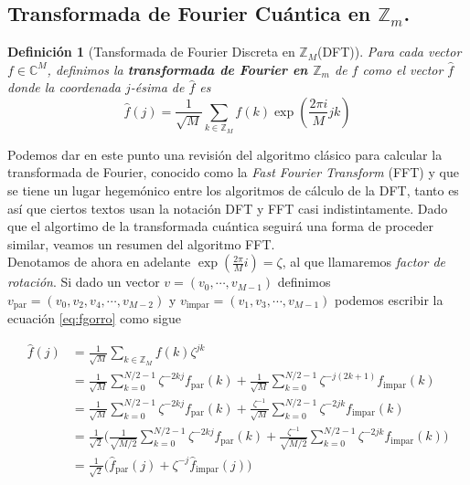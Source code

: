 \documentclass[11pt, spanish]{report}
\numberwithin{equation}{section}
\newtheorem{defin}{Definición}[section]
\numberwithin{defin}{section}
\newenvironment{yellowBox}{\begin{tcolorbox}[colback=yellow!5!white,colframe=yellow!75!black]}{\end{tcolorbox}}
\begin{document}
\subsection{Transformada de Fourier Cuántica en \texorpdfstring{$\mathbb{Z}_m$}{Zm}.}\label{FourierSecc}
\begin{yellowBox}
\begin{defin}[Tansformada de Fourier Discreta en $\mathbb{Z}_M$(DFT)]
Para cada vector $f\in \mathbb{C}^M$, definimos la \textbf{transformada de Fourier en $\mathbb{Z}_m$} de $f$ como el vector $\hat{f}$ donde la coordenada $j$-ésima de $\hat{f}$ es 
\begin{equation} \label{eq:fgorro}
\hat{f}(j)=\frac{1}{\sqrt{M}}\sum_{k\in \mathbb{Z}_M}f(k)\exp(\frac{2\pi i}{M}jk)
\end{equation}

\end{defin}
\end{yellowBox}

Podemos dar en este punto una revisión del algoritmo clásico para calcular la transformada de Fourier, conocido como la \emph{Fast Fourier Transform} (FFT) y que se tiene un lugar hegemónico entre los algoritmos de cálculo de la DFT, tanto es así que ciertos textos usan la notación DFT y FFT casi indistintamente. Dado que el algortimo de la transformada cuántica seguirá una forma de proceder similar, veamos un resumen del algoritmo FFT.\\

Denotamos de ahora en adelante $\exp(\frac{2\pi}{M}i)=\zeta$, al que llamaremos \emph{factor de rotación}. Si dado un vector $v=(v_0,\cdots,v_{M-1})$ definimos $v_\text{par}=(v_0,v_2, v_4,\cdots,v_{M-2})$ y $v_\text{impar}=(v_1, v_3,\cdots,v_{M-1})$ podemos escribir la ecuación \ref{eq:fgorro} como sigue

\begin{equation}
\begin{split}
\hat{f}(j)&=\frac{1}{\sqrt{M}}\sum_{k\in \mathbb{Z}_M}f(k)\zeta^{jk}\\
&=\frac{1}{\sqrt{M}}\sum_{k=0}^{N/2-1}\zeta^{-2kj}f_\text{par}(k)+\frac{1}{\sqrt{M}}\sum_{k=0}^{N/2-1}\zeta^{-j(2k+1)}f_{\text{impar}}(k)\\
&=\frac{1}{\sqrt{M}}\sum_{k=0}^{N/2-1}\zeta^{-2kj}f_\text{par}(k)+\frac{\zeta^{-1}}{\sqrt{M}}\sum_{k=0}^{N/2-1}\zeta^{-2jk}f_{\text{impar}}(k)\\
&=\frac{1}{\sqrt{2}}\Big(\frac{1}{\sqrt{M/2}}\sum_{k=0}^{N/2-1}\zeta^{-2kj}f_\text{par}(k)+\frac{\zeta^{-1}}{\sqrt{M/2}}\sum_{k=0}^{N/2-1}\zeta^{-2jk}f_{\text{impar}}(k)\Big)\\
&=\frac{1}{\sqrt{2}}\Big(\hat{f}_{\text{par}}(j)+\zeta^{-j}\hat{f}_{\text{impar}}(j)\Big)
\end{split}
\end{equation}
\end{document}
